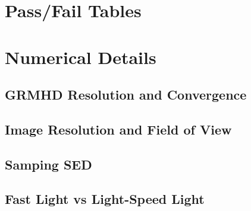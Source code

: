 \documentclass[twocolumn,twocolappendix,tighten,dvipsnames,linenumbers]{aastex63}
\begin{document}
\appendix

\section{Pass/Fail Tables}

\clearpage

\section{Numerical Details}

\subsection{GRMHD Resolution and Convergence}

\subsection{Image Resolution and Field of View}

\subsection{Samping SED}

\subsection{Fast Light vs Light-Speed Light}

\clearpage




\end{document}
